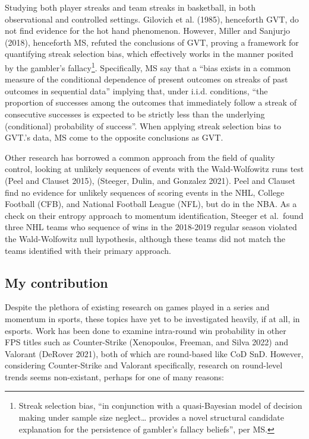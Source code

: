 \documentclass{article}
\begin{document}
Studying both player streaks and team streaks in basketball, in both
observational and controlled settings. Gilovich et al. (1985),
henceforth GVT, do not find evidence for the hot hand phenomenon.
However, Miller and Sanjurjo (2018), henceforth MS, refuted the
conclusions of GVT, proving a framework for quantifying streak selection
bias, which effectively works in the manner posited by the gambler's
fallacy\footnote{Streak selection bias, ``in conjunction with a
  quasi-Bayesian model of decision making under sample size
  neglect\ldots{} provides a novel structural candidate explanation for
  the persistence of gambler's fallacy beliefs'', per MS.}.
Specifically, MS say that a ``bias exists in a common measure of the
conditional dependence of present outcomes on streaks of past outcomes
in sequential data'' implying that, under i.i.d. conditions, ``the
proportion of successes among the outcomes that immediately follow a
streak of consecutive successes is expected to be strictly less than the
underlying (conditional) probability of success''. When applying streak
selection bias to GVT.'s data, MS come to the opposite conclusions as
GVT.

Other research has borrowed a common approach from the field of quality
control, looking at unlikely sequences of events with the Wald-Wolfowitz
runs test (Peel and Clauset 2015), (Steeger, Dulin, and Gonzalez 2021).
Peel and Clauset find no evidence for unlikely sequences of scoring
events in the NHL, College Football (CFB), and National Football League
(NFL), but do in the NBA. As a check on their entropy approach to
momentum identification, Steeger et al.~found three NHL teams who
sequence of wins in the 2018-2019 regular season violated the
Wald-Wolfowitz null hypothesis, although these teams did not match the
teams identified with their primary approach.

\hypertarget{my-contribution}{%
\subsection{My contribution}\label{my-contribution}}

Despite the plethora of existing research on games played in a series
and momentum in sports, these topics have yet to be investigated
heavily, if at all, in esports. Work has been done to examine
intra-round win probability in other FPS titles such as Counter-Strike
(Xenopoulos, Freeman, and Silva 2022) and Valorant (DeRover 2021), both
of which are round-based like CoD SnD. However, considering
Counter-Strike and Valorant specifically, research on round-level trends
seems non-existant, perhaps for one of many reasons:
\end{document}
